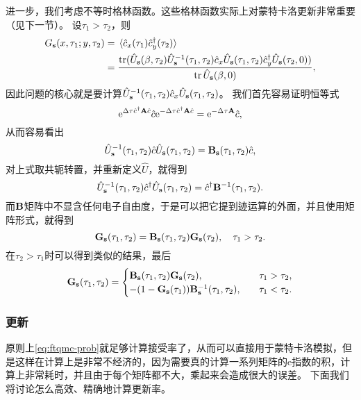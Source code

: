 \documentclass[hyperref, UTF8, a4paper]{ctexart}
\newcommand*{\ee}{\mathrm{e}}
\begin{document}
进一步，我们考虑不等时格林函数。这些格林函数实际上对蒙特卡洛更新非常重要（见下一节）。
设$\tau_1 > \tau_2$，则
\[
    \begin{aligned}
        G_{\vb{s}}(x, \tau_1; y, \tau_2) &= \expval*{\hat{c}_x(\tau_1) \hat{c}^\dagger_y(\tau_2)} \\
        &= \frac{\trace (\hat{U}_{\vb{s}}(\beta, \tau_2) \hat{U}_{\vb{s}}^{-1}(\tau_1, \tau_2) \hat{c}_x \hat{U}_{\vb{s}}(\tau_1, \tau_2) \hat{c}_y^\dagger \hat{U}_{\vb{s}}(\tau_2, 0))}{\trace \hat{U}_{\vb{s}}(\beta, 0)},
    \end{aligned}
\]
因此问题的核心就是要计算$\hat{U}_{\vb{s}}^{-1}(\tau_1, \tau_2) \hat{c}_x \hat{U}_{\vb{s}}(\tau_1, \tau_2)$。
我们首先容易证明恒等式
\[
    \ee^{\Delta \tau \hat{c}^\dagger \vb{A} \hat{c}} \hat{c} \ee^{- \Delta \tau \hat{c}^\dagger \vb{A} \hat{c}} = \ee^{- \Delta \tau \vb{A}} \hat{c},
\]
从而容易看出
\[
    \hat{U}_{\vb{s}}^{-1}(\tau_1, \tau_2) \hat{c} \hat{U}_{\vb{s}}(\tau_1, \tau_2) = \vb{B}_{\vb{s}}(\tau_1, \tau_2) \hat{c},
\]
对上式取共轭转置，并重新定义$\hat{U}$，就得到
\[
    \hat{U}_{\vb{s}}^{-1}(\tau_1, \tau_2) \hat{c}^\dagger \hat{U}_{\vb{s}}(\tau_1, \tau_2) = \hat{c}^\dagger \vb{B}^{-1}(\tau_1, \tau_2).
\]
而$\vb{B}$矩阵中不显含任何电子自由度，于是可以把它提到迹运算的外面，并且使用矩阵形式，就得到
\[
    \vb{G}_{\vb{s}}(\tau_1, \tau_2) = \vb{B}_{\vb{s}}(\tau_1, \tau_2) \vb{G}_{\vb{s}}(\tau_2), \quad \tau_1 > \tau_2.
\]
在$\tau_2 > \tau_1$时可以得到类似的结果，最后
\begin{equation}
    \vb{G}_{\vb{s}}(\tau_1, \tau_2) = \begin{cases}
        \vb{B}_{\vb{s}}(\tau_1, \tau_2) \vb{G}_{\vb{s}}(\tau_2), \quad &\tau_1 > \tau_2, \\
        - (1 - \vb{G}_{\vb{s}}(\tau_1)) \vb{B}^{-1}_{\vb{s}}(\tau_1, \tau_2) , \quad &\tau_1 < \tau_2.
    \end{cases}
\end{equation}

\subsubsection{更新}

原则上\eqref{eq:ftqmc-prob}就足够计算接受率了，从而可以直接用于蒙特卡洛模拟，但是这样在计算上是非常不经济的，因为需要真的计算一系列矩阵的$\ee$指数的积，计算上非常耗时，并且由于每个矩阵都不大，乘起来会造成很大的误差。
下面我们将讨论怎么高效、精确地计算更新率。
\end{document}
